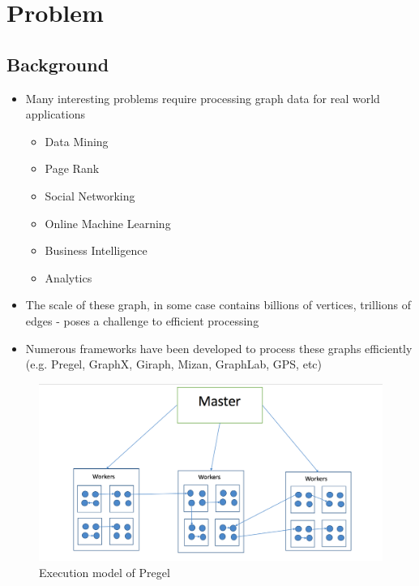 \section{Problem}

\subsection{Background}

\begin{frame}
\begin{itemize}
  \item Many interesting problems require processing graph data for real world applications \linebreak
  \begin{itemize}
  \item Data Mining
  \item Page Rank
  \item Social Networking
  \item Online Machine Learning
  \item Business Intelligence
  \item Analytics
  \end{itemize}	
\end{itemize}	
\end{frame}

\begin{frame}
\begin{itemize}
  \item The scale of these graph, in some case contains billions of vertices, trillions of edges - poses a challenge to efficient processing
  \linebreak
  \item Numerous frameworks have been developed to process these graphs efficiently (e.g. Pregel, GraphX, Giraph, Mizan, GraphLab, GPS, etc)
\end{itemize}	
\end{frame}

\begin{frame}
	 \begin{figure}
			\includegraphics[width=0.8\linewidth]{figures/execution1.png}
	\caption{Execution model of Pregel}
	\end{figure}
 \end{frame}	
	

